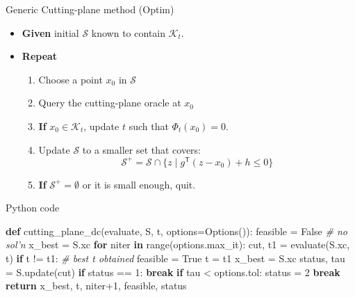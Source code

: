 \documentclass[10pt,ignorenonframetext,serif,onlymath]{beamer}
\newenvironment{Shaded}{}{}
\newcommand{\BuiltInTok}[1]{#1}
\newcommand{\CommentTok}[1]{\textcolor[rgb]{0.38,0.63,0.69}{\textit{#1}}}
\newcommand{\ControlFlowTok}[1]{\textcolor[rgb]{0.00,0.44,0.13}{\textbf{#1}}}
\newcommand{\DecValTok}[1]{\textcolor[rgb]{0.25,0.63,0.44}{#1}}
\newcommand{\KeywordTok}[1]{\textcolor[rgb]{0.00,0.44,0.13}{\textbf{#1}}}
\newcommand{\NormalTok}[1]{#1}
\newcommand{\OperatorTok}[1]{\textcolor[rgb]{0.40,0.40,0.40}{#1}}
\newcommand{\VariableTok}[1]{\textcolor[rgb]{0.10,0.09,0.49}{#1}}
\providecommand{\tightlist}{%
  \setlength{\itemsep}{0pt}\setlength{\parskip}{0pt}}
\begin{document}
\begin{frame}{Generic Cutting-plane method (Optim)}
\protect\hypertarget{sec:generic-cutting-plane-method-optim}{}

\begin{itemize}
\tightlist
\item
  \textbf{Given} initial \(\mathcal{S}\) known to contain
  \(\mathcal{K}_t\).
\item
  \textbf{Repeat}

  \begin{enumerate}
  [1.]
  \tightlist
  \item
    Choose a point \(x_0\) in \(\mathcal{S}\)
  \item
    Query the cutting-plane oracle at \(x_0\)
  \item
    \textbf{If} \(x_0 \in \mathcal{K}_t\), update \(t\) such that
    \(\Phi_t(x_0) = 0\).
  \item
    Update \(\mathcal{S}\) to a smaller set that covers:
    \[\mathcal{S}^+ = \mathcal{S} \cap \{z \mid g^\mathsf{T} (z - x_0) + h \leq 0\} \]
  \item
    \textbf{If} \(\mathcal{S}^+ = \emptyset\) or it is small enough,
    quit.
  \end{enumerate}
\end{itemize}

\end{frame}

\begin{frame}[fragile]{Python code}
\protect\hypertarget{sec:python-code-2}{}

\begin{Shaded}
\begin{Highlighting}[]
\KeywordTok{def}\NormalTok{ cutting_plane_dc(evaluate, S, t, options}\OperatorTok{=}\NormalTok{Options()):}
\NormalTok{    feasible }\OperatorTok{=} \VariableTok{False}  \CommentTok{# no sol'n}
\NormalTok{    x_best }\OperatorTok{=}\NormalTok{ S.xc}
    \ControlFlowTok{for}\NormalTok{ niter }\KeywordTok{in} \BuiltInTok{range}\NormalTok{(options.max_it):}
\NormalTok{        cut, t1 }\OperatorTok{=}\NormalTok{ evaluate(S.xc, t)}
        \ControlFlowTok{if}\NormalTok{ t }\OperatorTok{!=}\NormalTok{ t1:  }\CommentTok{# best t obtained}
\NormalTok{            feasible }\OperatorTok{=} \VariableTok{True}
\NormalTok{            t }\OperatorTok{=}\NormalTok{ t1}
\NormalTok{            x_best }\OperatorTok{=}\NormalTok{ S.xc}
\NormalTok{        status, tau }\OperatorTok{=}\NormalTok{ S.update(cut)}
        \ControlFlowTok{if}\NormalTok{ status }\OperatorTok{==} \DecValTok{1}\NormalTok{:}
            \ControlFlowTok{break}
        \ControlFlowTok{if}\NormalTok{ tau }\OperatorTok{<}\NormalTok{ options.tol:}
\NormalTok{            status }\OperatorTok{=} \DecValTok{2}
            \ControlFlowTok{break}
    \ControlFlowTok{return}\NormalTok{ x_best, t, niter}\OperatorTok{+}\DecValTok{1}\NormalTok{, feasible, status}
\end{Highlighting}
\end{Shaded}

\end{frame}
\end{document}
